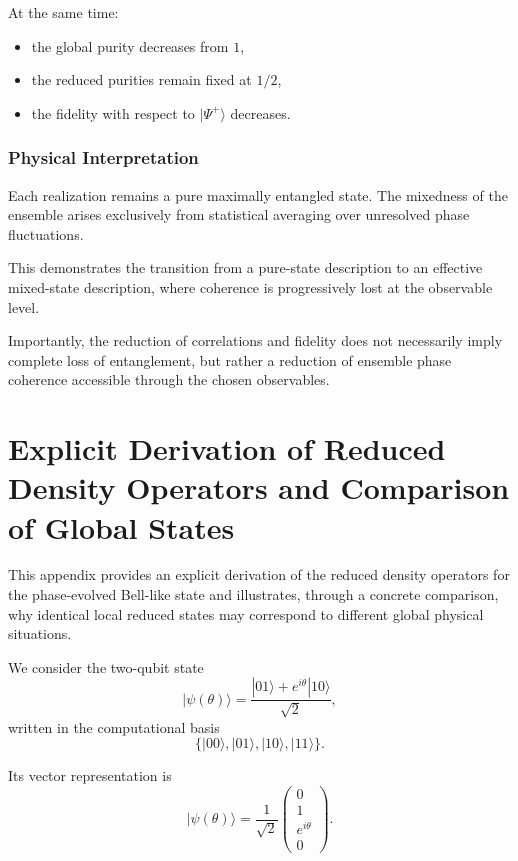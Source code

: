 \documentclass[a4paper]{article}
\begin{document}
At the same time:
\begin{itemize}
    \item the global purity decreases from \(1\),
    \item the reduced purities remain fixed at \(1/2\),
    \item the fidelity with respect to \( |\Psi^+\rangle \) decreases.
\end{itemize}

\subsubsection{Physical Interpretation}

Each realization remains a pure maximally entangled state. The mixedness of the ensemble arises exclusively from statistical averaging over unresolved phase fluctuations.

This demonstrates the transition from a pure-state description to an effective mixed-state description, where coherence is progressively lost at the observable level.

Importantly, the reduction of correlations and fidelity does not necessarily imply complete loss of entanglement, but rather a reduction of ensemble phase coherence accessible through the chosen observables.

\appendix
\section{Explicit Derivation of Reduced Density Operators and Comparison of Global States}

This appendix provides an explicit derivation of the reduced density operators for the phase-evolved Bell-like state and illustrates, through a concrete comparison, why identical local reduced states may correspond to different global physical situations.

We consider the two-qubit state
\[
|\psi(\theta)\rangle = \frac{|01\rangle + e^{i\theta}|10\rangle}{\sqrt{2}},
\]
written in the computational basis
\[
\{|00\rangle, |01\rangle, |10\rangle, |11\rangle\}.
\]

Its vector representation is
\[
|\psi(\theta)\rangle =
\frac{1}{\sqrt{2}}
\begin{pmatrix}
0 \\
1 \\
e^{i\theta} \\
0
\end{pmatrix}.
\]
\end{document}
